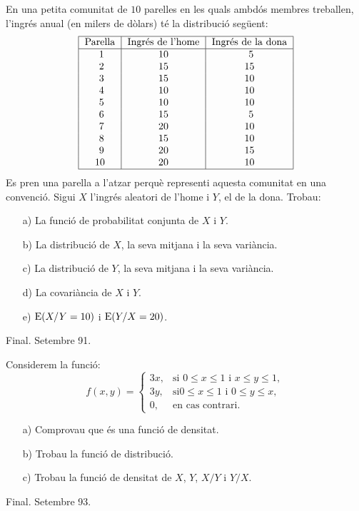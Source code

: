 \begin{prob}
{En una petita comunitat de $10$ parelles en les quals ambd\'os membres treballen,
l'ingr\'es anual (en milers de d\`olars) t\'e la distribuci\'o seg\"uent:
$$
\begin{tabular}{|c|c|c|}
\hline Parella &  Ingr\'es de l'home & Ingr\'es de la dona \\ \hline 
\ 1 & 10 & \ 5 \\ \ 2 & 15 & 15
\\ \ 3 & 15 & 10 \\ \ 4 & 10 & 10 \\ \ 5 & 10 & 10 \\ \ 6 & 15 
& \ 5 \\ \ 7 & 20 &
10 \\ \ 8 & 15 & 10 \\ \ 9 & 20 & 15 \\ 10 & 20 & 10 \\
\hline
\end{tabular}
$$
Es pren una parella a l'atzar perqu\`e representi 
aquesta comunitat en una convenci\'o. Sigui $X$ l'ingr\'es aleatori de
l'home i $Y$, el de la dona. Trobau:
\begin{itemize}
\item[a)] La funci\'o de probabilitat conjunta de $X$ i $Y$.
\item[b)] La distribuci\'o de $X$, la seva mitjana i la seva vari\`ancia.
\item[c)] La distribuci\'o de $Y$, la seva mitjana i la seva vari\`ancia.
\item[d)] La covari\`ancia de $X$ i $Y$.
\item[e)] ${\rm E} (X/Y=10)$ i ${\rm E} (Y/X=20)$.
\end{itemize}
{\footnotesize Final. Setembre 91.}
}
\end{prob}

\begin{prob}
{Considerem la funci\'o:
$$f(x,y)=
\left\{\begin{array}{ll}
3x, & \text{si $0\leq x\leq 1$ i $x\leq y\leq 1$},\\
3y, & \text{si
$0\leq x\leq 1$ i $0\leq y\leq x$},\\ 0, & \text{en cas contrari.}
\end{array}\right. 
$$
\begin{itemize}
\item[a)] {Comprovau que \'es una funci\'o de densitat.}
\item[b)] {Trobau la funci\'o de distribuci\'o.}
\item[c)] {Trobau la funci\'o de densitat de $X$, $Y$, $X/Y$ i $Y/X$.}
\end{itemize}

{\footnotesize Final. Setembre 93.}
}
\end{prob}

